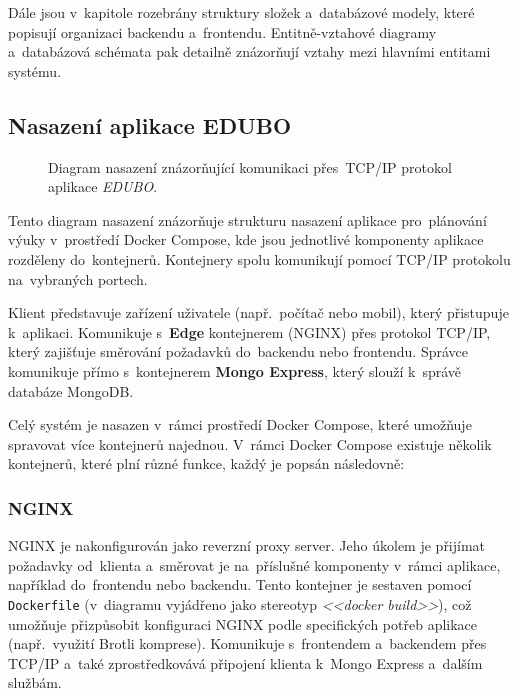 \documentclass[male,czech,api_bc]{kitheses}
\begin{document}
Dále jsou v~kapitole rozebrány struktury složek a~databázové modely, které popisují organizaci backendu a~frontendu. Entitně-vztahové diagramy a~databázová schémata pak detailně znázorňují vztahy mezi hlavními entitami systému.

\subsection{Nasazení aplikace EDUBO}

\begin{figure}[H]
	\centering
	\caption{Diagram nasazení znázorňující komunikaci přes~TCP/IP protokol aplikace \textit{EDUBO}.}
	\label{fig:deployment-diagram-1}
\end{figure}

Tento diagram nasazení znázorňuje strukturu nasazení aplikace pro~plánování výuky v~prostředí Docker Compose, kde jsou jednotlivé komponenty aplikace rozděleny do~kontejnerů. Kontejnery spolu komunikují pomocí TCP/IP protokolu na~vybraných portech.

Klient představuje zařízení uživatele (např.~počítač nebo mobil), který přistupuje k~aplikaci. Komunikuje s~\textbf{Edge} kontejnerem (NGINX) přes protokol TCP/IP, který zajišťuje směrování požadavků do~backendu nebo frontendu. Správce komunikuje přímo s~kontejnerem \textbf{Mongo Express}, který slouží k~správě databáze MongoDB.

Celý systém je nasazen v~rámci prostředí Docker Compose, které umožňuje spravovat více kontejnerů najednou. V~rámci Docker Compose existuje několik kontejnerů, které plní různé funkce, každý je popsán následovně:

\subsubsection{NGINX}
NGINX je nakonfigurován jako reverzní proxy server. Jeho úkolem je přijímat požadavky od~klienta a~směrovat je na~příslušné komponenty v~rámci aplikace, například do~frontendu nebo backendu. Tento kontejner je sestaven pomocí \texttt{Dockerfile} (v~diagramu vyjádřeno jako stereotyp \textit{<<docker build>>}), což umožňuje přizpůsobit konfiguraci NGINX podle specifických potřeb aplikace (např.~využití Brotli komprese). Komunikuje s~frontendem a~backendem přes TCP/IP a~také zprostředkovává připojení klienta k~Mongo Express a~dalším službám.
\end{document}
